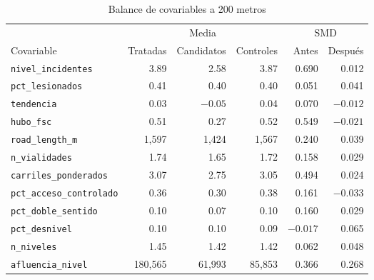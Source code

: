 \begin{table}[htbp]
    \centering
    \caption{Balance de covariables a 200 metros}
    \label{tab:balance-200}
    \footnotesize
    \setlength{\tabcolsep}{4pt}
    \begin{tabular}{l r r r r r}
        \toprule
        & \multicolumn{3}{c}{Media} & \multicolumn{2}{c}{SMD} \\
        \cmidrule(lr){2-4} \cmidrule(lr){5-6}
        Covariable & Tratadas & Candidatos & Controles & Antes & Después \\
        \midrule
        \texttt{nivel\_incidentes} & 3.89 & 2.58 & 3.87 & 0.690 & 0.012 \\
        \texttt{pct\_lesionados} & 0.41 & 0.40 & 0.40 & 0.051 & 0.041 \\
        \texttt{tendencia} & 0.03 & $-0.05$ & 0.04 & 0.070 & $-0.012$ \\
        \texttt{hubo\_fsc} & 0.51 & 0.27 & 0.52 & 0.549 & $-0.021$ \\
        \texttt{road\_length\_m} & 1,597 & 1,424 & 1,567 & 0.240 & 0.039 \\
        \texttt{n\_vialidades} & 1.74 & 1.65 & 1.72 & 0.158 & 0.029 \\
        \texttt{carriles\_ponderados} & 3.07 & 2.75 & 3.05 & 0.494 & 0.024 \\
        \texttt{pct\_acceso\_controlado} & 0.36 & 0.30 & 0.38 & 0.161 & $-0.033$ \\
        \texttt{pct\_doble\_sentido} & 0.10 & 0.07 & 0.10 & 0.160 & 0.029 \\
        \texttt{pct\_desnivel} & 0.10 & 0.10 & 0.09 & $-0.017$ & 0.065 \\
        \texttt{n\_niveles} & 1.45 & 1.42 & 1.42 & 0.062 & 0.048 \\
        \texttt{afluencia\_nivel} & 180,565 & 61,993 & 85,853 & 0.366 & 0.268 \\
        \bottomrule
    \end{tabular}
\end{table}

